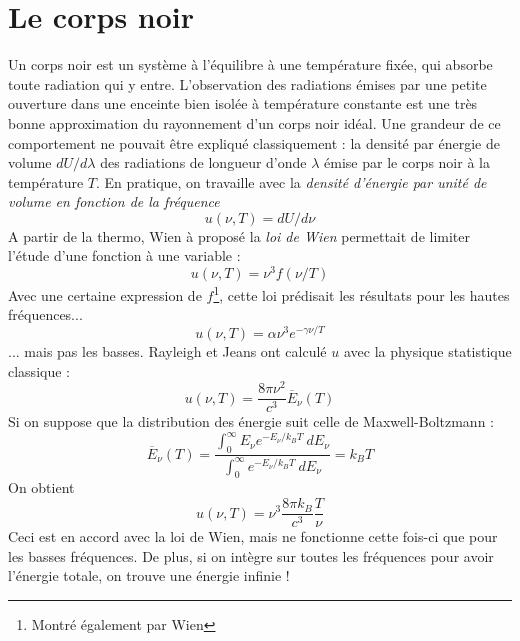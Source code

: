 \documentclass	[11pt, a4paper, openany]{book}
\begin{document}
		\section{Le corps noir}
		Un corps noir est un système à l'équilibre à une température fixée, qui absorbe toute radiation qui y 
		entre. L'observation des radiations émises par une petite ouverture dans une enceinte bien isolée à 
		température constante est une très bonne approximation du rayonnement d'un corps noir idéal. Une 
		grandeur de ce comportement ne pouvait être expliqué classiquement : la densité par énergie de volume 
		$dU/d\lambda$ des radiations de longueur d'onde $\lambda$ émise par le corps noir à la température $T$.
		En pratique, on travaille avec la \textit{densité d'énergie par unité de volume en fonction de la fréquence} 
		\begin{equation}
			u(\nu,T) = dU/d\nu
		\end{equation}
		A partir de la thermo, Wien à proposé la \textit{loi de Wien} permettait de limiter l'étude d'une fonction
		à une variable :
		\begin{equation}
			u(\nu,T) = \nu^3f(\nu/T)
		\end{equation}
		Avec une certaine expression de $f$\footnote{Montré également par Wien}, cette loi prédisait les résultats 
		pour les hautes fréquences...
		\begin{equation}
			u(\nu,T) = \alpha \nu^3 e^{-\gamma\nu/T}
		\end{equation}
		... mais pas les basses. Rayleigh et Jeans ont calculé $u$ avec la physique statistique classique :
		\begin{equation}
			u(\nu,T) = \dfrac{8\pi\nu^2}{c^3}\overline{E}_\nu(T)
			\label{eq:IdeePlanck}
		\end{equation}
		Si on suppose que la distribution des énergie suit celle de Maxwell-Boltzmann :
		\begin{equation}
			\overline{E}_\nu(T) = \dfrac{\int_0^\infty E_\nu e^{-E_\nu/k_BT}\ dE_\nu}{\int_0^\infty
				e^{-E_\nu/k_BT}\ dE_\nu} = k_BT
			\label{eq:CalculEv}
		\end{equation}
		On obtient
		\begin{equation}
			u(\nu,T) = \nu^3\dfrac{8\pi k_B}{c^3}\dfrac{T}{\nu}
		\end{equation}
		Ceci est en accord avec la loi de Wien, mais ne fonctionne cette fois-ci que pour les basses fréquences. De 
		plus, si on intègre sur toutes les fréquences pour avoir l'énergie totale, on trouve une énergie infinie ! 
		
\end{document}
